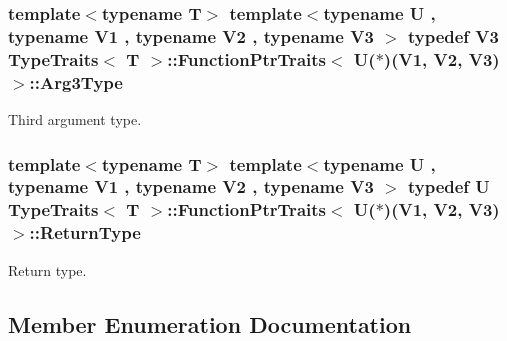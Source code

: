 \subsubsection[{\texorpdfstring{Arg3\+Type}{Arg3Type}}]{\setlength{\rightskip}{0pt plus 5cm}template$<$typename T$>$ template$<$typename U , typename V1 , typename V2 , typename V3 $>$ typedef V3 {\bf Type\+Traits}$<$ T $>$\+::{\bf Function\+Ptr\+Traits}$<$ U($\ast$)(V1, V2, V3)$>$\+::{\bf Arg3\+Type}}\hypertarget{structTypeTraits_1_1FunctionPtrTraits_3_01U_07_5_08_07V1_00_01V2_00_01V3_08_4_a77f0f67698ea7246138937c2d460b562}{}\label{structTypeTraits_1_1FunctionPtrTraits_3_01U_07_5_08_07V1_00_01V2_00_01V3_08_4_a77f0f67698ea7246138937c2d460b562}
Third argument type. 
\subsubsection[{\texorpdfstring{Return\+Type}{ReturnType}}]{\setlength{\rightskip}{0pt plus 5cm}template$<$typename T$>$ template$<$typename U , typename V1 , typename V2 , typename V3 $>$ typedef U {\bf Type\+Traits}$<$ T $>$\+::{\bf Function\+Ptr\+Traits}$<$ U($\ast$)(V1, V2, V3)$>$\+::{\bf Return\+Type}}\hypertarget{structTypeTraits_1_1FunctionPtrTraits_3_01U_07_5_08_07V1_00_01V2_00_01V3_08_4_a88c3eca3e997917909aea3d910097061}{}\label{structTypeTraits_1_1FunctionPtrTraits_3_01U_07_5_08_07V1_00_01V2_00_01V3_08_4_a88c3eca3e997917909aea3d910097061}
Return type. 

\subsection{Member Enumeration Documentation}
